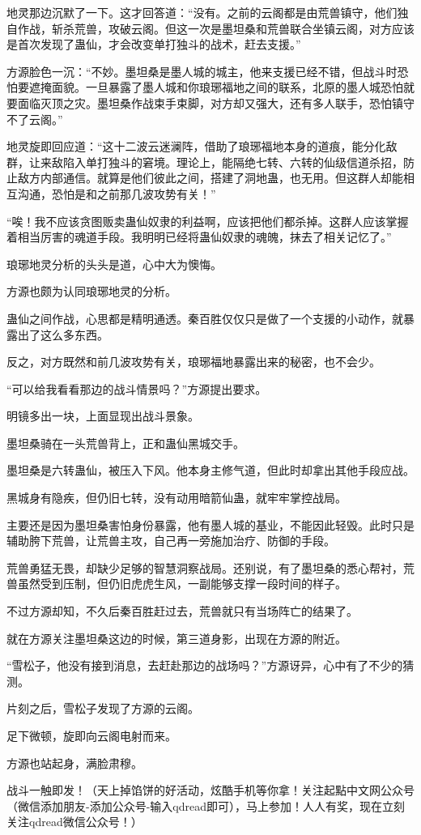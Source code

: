 \begin{this_body}
地灵那边沉默了一下。这才回答道：“没有。之前的云阁都是由荒兽镇守，他们独自作战，斩杀荒兽，攻破云阁。但这一次是墨坦桑和荒兽联合坐镇云阁，对方应该是首次发现了蛊仙，才会改变单打独斗的战术，赶去支援。”

方源脸色一沉：“不妙。墨坦桑是墨人城的城主，他来支援已经不错，但战斗时恐怕要遮掩面貌。一旦暴露了墨人城和你琅琊福地之间的联系，北原的墨人城恐怕就要面临灭顶之灾。墨坦桑作战束手束脚，对方却又强大，还有多人联手，恐怕镇守不了云阁。”

地灵旋即回应道：“这十二波云迷澜阵，借助了琅琊福地本身的道痕，能分化敌群，让来敌陷入单打独斗的窘境。理论上，能隔绝七转、六转的仙级信道杀招，防止敌方内部通信。就算是他们彼此之间，搭建了洞地蛊，也无用。但这群人却能相互沟通，恐怕是和之前那几波攻势有关！”

“唉！我不应该贪图贩卖蛊仙奴隶的利益啊，应该把他们都杀掉。这群人应该掌握着相当厉害的魂道手段。我明明已经将蛊仙奴隶的魂魄，抹去了相关记忆了。”

琅琊地灵分析的头头是道，心中大为懊悔。

方源也颇为认同琅琊地灵的分析。

蛊仙之间作战，心思都是精明通透。秦百胜仅仅只是做了一个支援的小动作，就暴露出了这么多东西。

反之，对方既然和前几波攻势有关，琅琊福地暴露出来的秘密，也不会少。

“可以给我看看那边的战斗情景吗？”方源提出要求。

明镜多出一块，上面显现出战斗景象。

墨坦桑骑在一头荒兽背上，正和蛊仙黑城交手。

墨坦桑是六转蛊仙，被压入下风。他本身主修气道，但此时却拿出其他手段应战。

黑城身有隐疾，但仍旧七转，没有动用暗箭仙蛊，就牢牢掌控战局。

主要还是因为墨坦桑害怕身份暴露，他有墨人城的基业，不能因此轻毁。此时只是辅助胯下荒兽，让荒兽主攻，自己再一旁施加治疗、防御的手段。

荒兽勇猛无畏，却缺少足够的智慧洞察战局。还别说，有了墨坦桑的悉心帮衬，荒兽虽然受到压制，但仍旧虎虎生风，一副能够支撑一段时间的样子。

不过方源却知，不久后秦百胜赶过去，荒兽就只有当场阵亡的结果了。

就在方源关注墨坦桑这边的时候，第三道身影，出现在方源的附近。

“雪松子，他没有接到消息，去赶赴那边的战场吗？”方源讶异，心中有了不少的猜测。

片刻之后，雪松子发现了方源的云阁。

足下微顿，旋即向云阁电射而来。

方源也站起身，满脸肃穆。

战斗一触即发！（天上掉馅饼的好活动，炫酷手机等你拿！关注起點中文网公众号（微信添加朋友-添加公众号-输入qdread即可），马上参加！人人有奖，现在立刻关注qdread微信公众号！）

\end{this_body}

